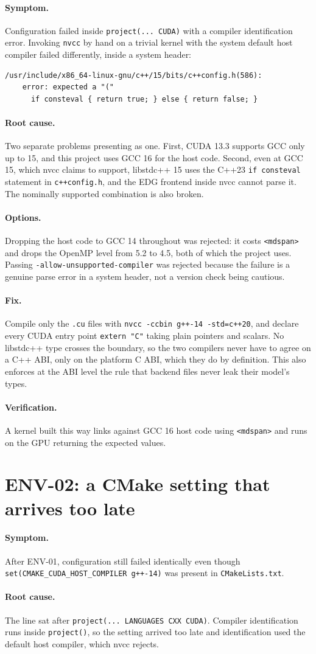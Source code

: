 \documentclass[11pt,a4paper]{report}
\newcommand{\symptom}[1]{\paragraph{Symptom.}#1}
\newcommand{\rootcause}[1]{\paragraph{Root cause.}#1}
\newcommand{\options}[1]{\paragraph{Options.}#1}
\newcommand{\fix}[1]{\paragraph{Fix.}#1}
\newcommand{\verification}[1]{\paragraph{Verification.}#1}
\begin{document}
\symptom{Configuration failed inside \texttt{project(... CUDA)} with a compiler
identification error. Invoking \texttt{nvcc} by hand on a trivial kernel with the
system default host compiler failed differently, inside a system header:}

\begin{lstlisting}
/usr/include/x86_64-linux-gnu/c++/15/bits/c++config.h(586):
    error: expected a "("
      if consteval { return true; } else { return false; }
\end{lstlisting}

\rootcause{Two separate problems presenting as one. First, CUDA 13.3 supports
GCC only up to 15, and this project uses GCC 16 for the host code. Second, even
at GCC 15, which nvcc claims to support, libstdc++ 15 uses the C++23
\texttt{if consteval} statement in \texttt{c++config.h}, and the EDG frontend
inside nvcc cannot parse it. The nominally supported combination is also
broken.}

\options{Dropping the host code to GCC 14 throughout was rejected: it costs
\texttt{<mdspan>} and drops the OpenMP level from 5.2 to 4.5, both of which the
project uses. Passing \texttt{-allow-unsupported-compiler} was rejected because
the failure is a genuine parse error in a system header, not a version check
being cautious.}

\fix{Compile only the \texttt{.cu} files with \texttt{nvcc -ccbin g++-14
-std=c++20}, and declare every CUDA entry point \texttt{extern "C"} taking plain
pointers and scalars. No libstdc++ type crosses the boundary, so the two
compilers never have to agree on a C++ ABI, only on the platform C ABI, which
they do by definition. This also enforces at the ABI level the rule that backend
files never leak their model's types.}

\verification{A kernel built this way links against GCC 16 host code using
\texttt{<mdspan>} and runs on the GPU returning the expected values.}

\section{ENV-02: a CMake setting that arrives too late}

\symptom{After ENV-01, configuration still failed identically even though
\texttt{set(CMAKE\_CUDA\_HOST\_COMPILER g++-14)} was present in
\texttt{CMakeLists.txt}.}

\rootcause{The line sat after \texttt{project(... LANGUAGES CXX CUDA)}. Compiler
identification runs inside \texttt{project()}, so the setting arrived too late
and identification used the default host compiler, which nvcc rejects.}
\end{document}
